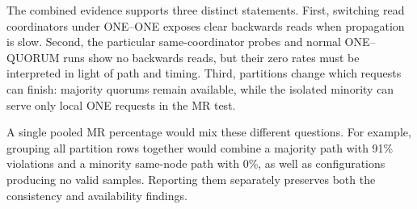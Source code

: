 The combined evidence supports three distinct statements. First, switching read coordinators under ONE--ONE exposes clear backwards reads when propagation is slow. Second, the particular same-coordinator probes and normal ONE--QUORUM runs show no backwards reads, but their zero rates must be interpreted in light of path and timing. Third, partitions change which requests can finish: majority quorums remain available, while the isolated minority can serve only local ONE requests in the MR test.

A single pooled MR percentage would mix these different questions. For example, grouping all partition rows together would combine a majority path with 91\% violations and a minority same-node path with 0\%, as well as configurations producing no valid samples. Reporting them separately preserves both the consistency and availability findings.
